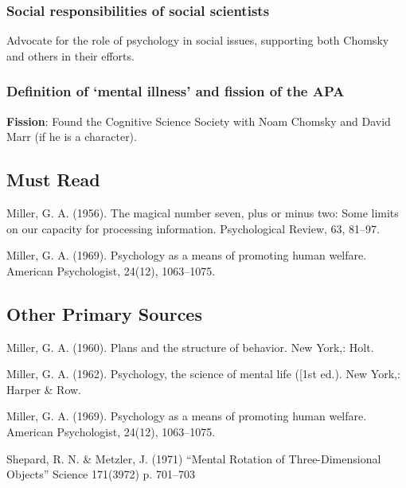 \begin{refsection}
\subsubsection{Social responsibilities of social scientists}
\label{socialresponsibilitiesofsocialscientists}

Advocate for the role of psychology in social issues, supporting both Chomsky and others in their efforts.

\subsubsection{Definition of ‘mental illness’ and fission of the APA}
\label{definitionof‘mentalillness’andfissionoftheapa}

\textbf{Fission}: Found the Cognitive Science Society with Noam Chomsky and David Marr (if he is a character).

\subsection{Must Read}
\label{mustread}

Miller, G. A. (1956). The magical number seven, plus or minus two: Some limits on our capacity for processing information. Psychological Review, 63, 81--97.

Miller, G. A. (1969). Psychology as a means of promoting human welfare. American Psychologist, 24(12), 1063--1075.

\subsection{Other Primary Sources}
\label{otherprimarysources}

Miller, G. A. (1960). Plans and the structure of behavior. New York,: Holt.

Miller, G. A. (1962). Psychology, the science of mental life ([1st ed.). New York,: Harper \& Row.

Miller, G. A. (1969). Psychology as a means of promoting human welfare. American Psychologist, 24(12), 1063--1075.

Shepard, R. N. \& Metzler, J. (1971) “Mental Rotation of Three-Dimensional Objects” Science 171(3972) p. 701--703


\end{refsection}
\stopcontents[rolesheets]

